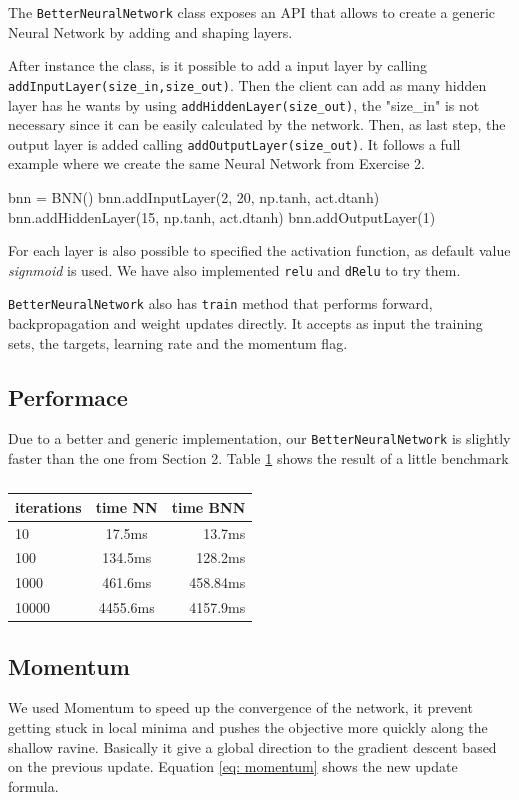 \documentclass[11pt]{article}
\begin{document}
The \texttt{BetterNeuralNetwork} class exposes an API that allows to create a generic Neural Network by adding and shaping layers.

After instance the class, is it possible to add a input layer by calling \texttt{addInputLayer(size\_in,size\_out)}. Then the client can add as many hidden layer has he wants by using \texttt{addHiddenLayer(size\_out)}, the "size\_in" is not necessary since it can be easily calculated by the network. Then, as last step, the output layer is added calling \texttt{addOutputLayer(size\_out)}. It follows a full example where we create the same Neural Network from Exercise 2.
\begin{python}
   bnn = BNN()
   bnn.addInputLayer(2, 20, np.tanh, act.dtanh)
   bnn.addHiddenLayer(15, np.tanh, act.dtanh)
   bnn.addOutputLayer(1)
\end{python}

For each layer is also possible to specified the activation function, as default value \emph{signmoid} is used. We have also implemented \texttt{relu} and \texttt{dRelu} to try them.

\texttt{BetterNeuralNetwork} also has \texttt{train} method that performs forward, backpropagation and weight updates directly. It accepts as input the training sets, the targets, learning rate and the momentum flag.
\subsection{Performace}
Due to a better and generic implementation, our \texttt{BetterNeuralNetwork} is slightly faster than the one from Section 2. Table \ref{table: performance_NN_BNN} shows the result of a little benchmark
\begin{table}[ht]
	\label{table: performance_NN_BNN}
\centering
  \begin{tabular}{ | l | c | r |}
    \hline
    iterations & time NN & time BNN\\ \hline
    10 & 17.5ms  & 13.7ms \\ \hline
    100 & 134.5ms  & 128.2ms \\ 
    1000 & 461.6ms  & 458.84ms \\ \hline
    10000 & 4455.6ms & 4157.9ms \\ \hline    
  \end{tabular}
  \caption{}
\end{table}

\subsection{Momentum}
We used Momentum to speed up the convergence of the network, it prevent getting stuck in local minima and pushes the objective more quickly along the shallow ravine. Basically it give a global direction to the gradient descent based on the previous update. Equation \ref{eq: momentum} shows the new update formula. 
\end{document}
